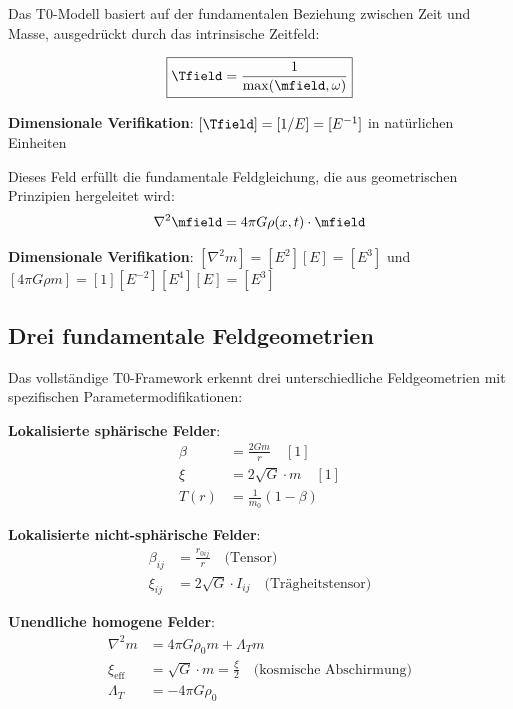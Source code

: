 	Das T0-Modell basiert auf der fundamentalen Beziehung zwischen Zeit und Masse, ausgedrückt durch das intrinsische Zeitfeld:
	
	\begin{equation}
		\boxed{\Tfield = \frac{1}{\max(\mfield, \omega)}}
		\label{eq:intrinsisches_zeitfeld}
	\end{equation}
	
	\textbf{Dimensionale Verifikation}: $[\Tfield] = [1/E] = [E^{-1}]$ in natürlichen Einheiten \checkmark
	
	Dieses Feld erfüllt die fundamentale Feldgleichung, die aus geometrischen Prinzipien hergeleitet wird:
	\begin{equation}
		\nabla^2 \mfield = 4\pi G \rho(x,t) \cdot \mfield
		\label{eq:feldgleichung}
	\end{equation}
	
	\textbf{Dimensionale Verifikation}: $[\nabla^2 m] = [E^2][E] = [E^3]$ und $[4\pi G \rho m] = [1][E^{-2}][E^4][E] = [E^3]$ \checkmark
	
	\subsection{Drei fundamentale Feldgeometrien}
	\label{subsec:drei_geometrien}
	
	Das vollständige T0-Framework erkennt drei unterschiedliche Feldgeometrien mit spezifischen Parametermodifikationen:
	
	\begin{tcolorbox}[colback=blue!5!white,colframe=blue!75!black,title=T0-Modell-Parameterrahmen]
		\textbf{Lokalisierte sphärische Felder}:
		\begin{align}
			\beta &= \frac{2Gm}{r} \quad [1] \\
			\xi &= 2\sqrt{G} \cdot m \quad [1] \\
			T(r) &= \frac{1}{m_0}(1 - \beta)
		\end{align}
		
		\textbf{Lokalisierte nicht-sphärische Felder}:
		\begin{align}
			\beta_{ij} &= \frac{r_{0ij}}{r} \quad \text{(Tensor)} \\
			\xi_{ij} &= 2\sqrt{G} \cdot I_{ij} \quad \text{(Trägheitstensor)}
		\end{align}
		
		\textbf{Unendliche homogene Felder}:
		\begin{align}
			\nabla^2 m &= 4\pi G \rho_0 m + \Lambda_T m \\
			\xi_{\text{eff}} &= \sqrt{G} \cdot m = \frac{\xi}{2} \quad \text{(kosmische Abschirmung)} \\
			\Lambda_T &= -4\pi G \rho_0
		\end{align}
	\end{tcolorbox}
	
